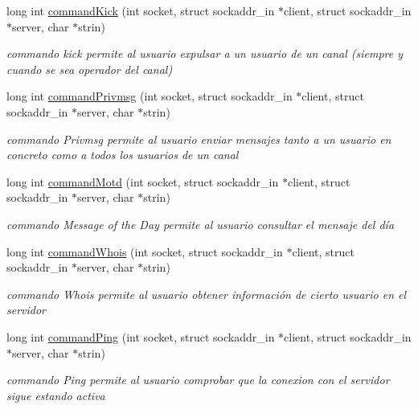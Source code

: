 \begin{DoxyCompactItemize}
long int \hyperlink{_g-2301-05-_p1-commands_8h_a1a1a0b84710fb5d6735e672b17fba549}{command\-Kick} (int socket, struct sockaddr\-\_\-in $\ast$client, struct sockaddr\-\_\-in $\ast$server, char $\ast$strin)
\begin{DoxyCompactList}\small\item\em commando kick permite al usuario expulsar a un usuario de un canal (siempre y cuando se sea operador del canal) \end{DoxyCompactList}\item 
long int \hyperlink{_g-2301-05-_p1-commands_8h_a0a4c40bf7931be7bd3f56586abf64357}{command\-Privmsg} (int socket, struct sockaddr\-\_\-in $\ast$client, struct sockaddr\-\_\-in $\ast$server, char $\ast$strin)
\begin{DoxyCompactList}\small\item\em commando Privmsg permite al usuario enviar mensajes tanto a un usuario en concreto como a todos los usuarios de un canal \end{DoxyCompactList}\item 
long int \hyperlink{_g-2301-05-_p1-commands_8h_af2e41d9c9e7f057a6f139528d75c8e87}{command\-Motd} (int socket, struct sockaddr\-\_\-in $\ast$client, struct sockaddr\-\_\-in $\ast$server, char $\ast$strin)
\begin{DoxyCompactList}\small\item\em commando Message of the Day permite al usuario consultar el mensaje del día \end{DoxyCompactList}\item 
long int \hyperlink{_g-2301-05-_p1-commands_8h_a5e1f1b69c0a63183b62225298d9ea0b6}{command\-Whois} (int socket, struct sockaddr\-\_\-in $\ast$client, struct sockaddr\-\_\-in $\ast$server, char $\ast$strin)
\begin{DoxyCompactList}\small\item\em commando Whois permite al usuario obtener información de cierto usuario en el servidor \end{DoxyCompactList}\item 
long int \hyperlink{_g-2301-05-_p1-commands_8h_a4a1c3256c2cd2bbaf8c04b641de8e89b}{command\-Ping} (int socket, struct sockaddr\-\_\-in $\ast$client, struct sockaddr\-\_\-in $\ast$server, char $\ast$strin)
\begin{DoxyCompactList}\small\item\em commando Ping permite al usuario comprobar que la conexion con el servidor sigue estando activa \end{DoxyCompactList}\item 

\end{DoxyCompactItemize}
